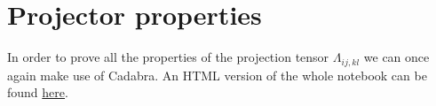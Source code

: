 \documentclass[main.tex]{subfiles}
\begin{document}
\section{Projector properties}

In order to prove all the properties of the projection tensor \(\Lambda_{ij, kl}\) we can once again make use of Cadabra.
An HTML version of the whole notebook can be found \href{https://jacopok.github.io/projector.html}{here}.
\end{document}
